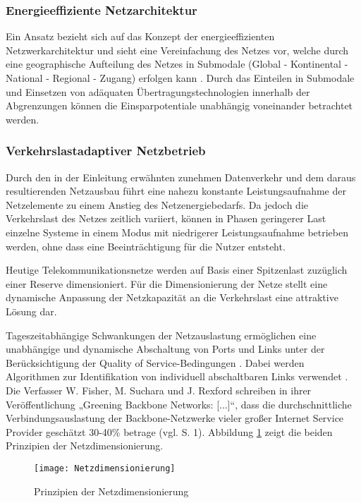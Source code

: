 \subsubsection{Energieeffiziente Netzarchitektur}
Ein Ansatz bezieht sich auf das Konzept der energieeffizienten Netzwerkarchitektur und sieht eine Vereinfachung des Netzes vor, welche durch eine geographische Aufteilung des Netzes in Submodale (Global - Kontinental - National - Regional - Zugang) erfolgen kann \cite{aleksic2014}. Durch das Einteilen in Submodale und Einsetzen von adäquaten Übertragungs\-technologien innerhalb der Abgrenzungen können die Einsparpotentiale unabhängig voneinander betrachtet werden.

\subsubsection{Verkehrslastadaptiver Netzbetrieb}

Durch den in der Einleitung erwähnten zunehmen Datenverkehr und dem daraus resultierenden Netzausbau führt eine nahezu konstante Leistungsaufnahme der Netzelemente zu einem Anstieg des Netzenergiebedarfs. Da jedoch die Verkehrslast des Netzes zeitlich variiert, können in Phasen geringerer Last einzelne Systeme in einem Modus mit niedrigerer Leistungsaufnahme betrieben werden, ohne dass eine Beeinträchtigung für die Nutzer entsteht.

Heutige Telekommunikationsnetze werden auf Basis einer Spitzenlast zuzüglich einer Reserve dimensioniert. Für die Dimensionierung der Netze stellt eine dynamische Anpassung der Netzkapazität an die Verkehrslast eine attraktive Lösung dar. %

Tageszeitabhängige Schwankungen der Netzauslastung ermöglichen eine unabhängige und dynamische Abschaltung von Ports und Links unter der Berücksichtigung der Quality of Service-Bedingungen \cite{aleksic2013}. Dabei werden Algorithmen zur Identifikation von individuell abschaltbaren Links verwendet \cite{fassnacht}. Die Verfasser W. Fisher, M. Suchara und J. Rexford schreiben in ihrer Veröffentlichung „Greening Backbone Networks: [...]“, dass die durchschnittliche Verbindungsauslastung der Backbone-Netzwerke vieler großer Internet Service Provider geschätzt 30-40\% betrage (vgl. \cite{fisher} S. 1). Abbildung \ref{fig:Netzdimensionierung} zeigt die beiden Prinzipien der Netzdimensionierung.

\begin{figure}[!ht]
	\centering
	\texttt{[image: Netzdimensionierung]}
	\caption{Prinzipien der Netzdimensionierung}
	\label{fig:Netzdimensionierung}
\end{figure}

